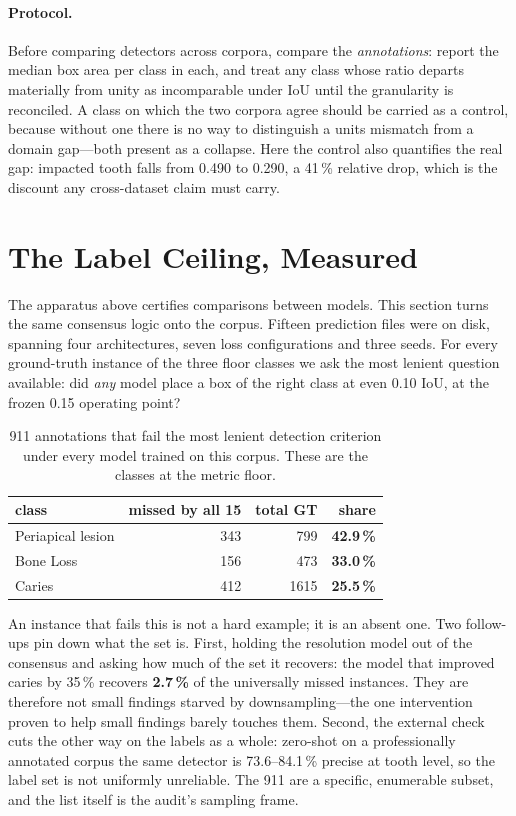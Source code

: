 \documentclass[10pt,twocolumn,letterpaper]{article}
\begin{document}
\paragraph{Protocol.} Before comparing detectors across corpora, compare the
\emph{annotations}: report the median box area per class in each, and treat any
class whose ratio departs materially from unity as incomparable under IoU until
the granularity is reconciled. A class on which the two corpora agree should be
carried as a control, because without one there is no way to distinguish a
units mismatch from a domain gap---both present as a collapse. Here the control
also quantifies the real gap: impacted tooth falls from 0.490 to 0.290, a
41\,\% relative drop, which is the discount any cross-dataset claim must carry.

\section{The Label Ceiling, Measured}
\label{sec:ceiling}

The apparatus above certifies comparisons between models. This section turns
the same consensus logic onto the corpus. Fifteen prediction files were on
disk, spanning four architectures, seven loss configurations and three seeds.
For every ground-truth instance of the three floor classes we ask the most
lenient question available: did \emph{any} model place a box of the right
class at even 0.10 IoU, at the frozen 0.15 operating point?

\begin{table}[h]
\centering\small
\begin{tabular}{lrrr}
\toprule
class & missed by all 15 & total GT & share \\
\midrule
Periapical lesion & 343 & 799 & \textbf{42.9\,\%} \\
Bone Loss & 156 & 473 & \textbf{33.0\,\%} \\
Caries & 412 & 1615 & \textbf{25.5\,\%} \\
\bottomrule
\end{tabular}
\caption{911 annotations that fail the most lenient detection criterion under
every model trained on this corpus. These are the classes at the metric
floor.}
\end{table}

An instance that fails this is not a hard example; it is an absent one. Two
follow-ups pin down what the set is. First, holding the resolution model out
of the consensus and asking how much of the set it recovers: the model that
improved caries by 35\,\% recovers \textbf{2.7\,\%} of the universally missed
instances. They are therefore not small findings starved by downsampling---the
one intervention proven to help small findings barely touches them. Second,
the external check cuts the other way on the labels as a whole: zero-shot on a
professionally annotated corpus the same detector is 73.6--84.1\,\% precise at
tooth level, so the label set is not uniformly unreliable. The 911 are a
specific, enumerable subset, and the list itself is the audit's sampling
frame.
\end{document}
